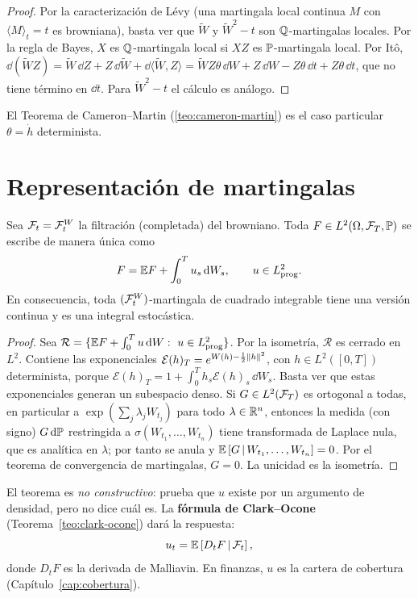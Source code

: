 \begin{proof}
Por la caracterización de Lévy (una martingala local continua $M$ con $\langle M\rangle_t=t$
es browniana), basta ver que $\tilde W$ y $\tilde W^2-t$ son $\Q$-martingalas locales. Por la regla de Bayes, $X$ es
$\Q$-martingala local si $XZ$ es $\P$-martingala local. Por Itô, $\dd(\tilde WZ)=\tilde W\,\dd Z+Z\,\dd\tilde W+\dd\langle\tilde W,Z\rangle=
\tilde WZ\theta\,\dd W+Z\,\dd W-Z\theta\,\dd t+Z\theta\,\dd t$, que no tiene término en $\dd t$. Para $\tilde W^2-t$ el cálculo es
análogo.
\end{proof}

El Teorema de Cameron--Martin (\ref{teo:cameron-martin}) es el caso particular $\theta=\dot h$ determinista.

\section{Representación de martingalas}

\begin{teorema}\label{teo:representacion}
Sea $\F_t=\F^W_t$ la filtración (completada) del
browniano. Toda $F\in L^2(\Omega,\F_T,\P)$ se escribe de manera única como
\[
  F=\E F+\int_0^Tu_s\,\dd W_s,\qquad u\in L^2_{\mathrm{prog}}.
\]
En consecuencia, toda $(\F^W_t)$-martingala de cuadrado integrable tiene una versión continua y
es una integral estocástica.
\end{teorema}

\begin{proof}
Sea $\mathcal R=\{\E F+\int_0^Tu\,\dd W:\ u\in L^2_{\mathrm{prog}}\}$. Por la isometría, $\mathcal R$ es cerrado en
$L^2$. Contiene las exponenciales $\mathcal E(h)_T=e^{W(h)-\frac12\norm{h}^2}$, con $h\in L^2([0,T])$ determinista, porque
$\mathcal E(h)_T=1+\int_0^Th_s\mathcal E(h)_s\,\dd W_s$. Basta ver que estas exponenciales generan un subespacio denso. Si
$G\in L^2(\F_T)$ es ortogonal a todas, en particular a $\exp(\sum_j\lambda_jW_{t_j})$ para todo $\lambda\in\R^n$, entonces la
medida (con signo) $G\,\dd\P$ restringida a $\sigma(W_{t_1},\dots,W_{t_n})$ tiene transformada de Laplace nula, que
es analítica en $\lambda$; por tanto se anula y $\cond{G}{W_{t_1},\dots,W_{t_n}}=0$. Por el teorema de convergencia
de martingalas, $G=0$. La unicidad es la isometría.
\end{proof}

\begin{intuicion}
El teorema es \emph{no constructivo}: prueba que $u$ existe por un argumento de densidad, pero
no dice cuál es. La \textbf{fórmula de Clark--Ocone} (Teorema~\ref{teo:clark-ocone}) dará la respuesta:
\[
  u_t=\cond{D_tF}{\F_t},
\]
donde $D_tF$ es la derivada de Malliavin. En finanzas, $u$ es la cartera de cobertura
(Capítulo~\ref{cap:cobertura}).
\end{intuicion}
